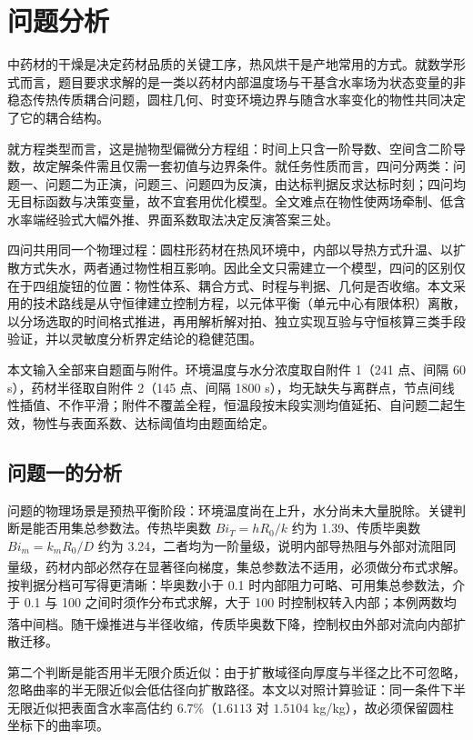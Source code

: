 \section{问题分析}
中药材的干燥是决定药材品质的关键工序，热风烘干是产地常用的方式。就数学形式而言，题目要求求解的是一类以药材内部温度场与干基含水率场为状态变量的非稳态传热传质耦合问题，圆柱几何、时变环境边界与随含水率变化的物性共同决定了它的耦合结构。

就方程类型而言，这是抛物型偏微分方程组：时间上只含一阶导数、空间含二阶导数，故定解条件需且仅需一套初值与边界条件。就任务性质而言，四问分两类：问题一、问题二为正演，问题三、问题四为反演，由达标判据反求达标时刻；四问均无目标函数与决策变量，故不宜套用优化模型。全文难点在物性使两场牵制、低含水率端经验式大幅外推、界面系数取法决定反演答案三处。

四问共用同一个物理过程：圆柱形药材在热风环境中，内部以导热方式升温、以扩散方式失水，两者通过物性相互影响。因此全文只需建立一个模型，四问的区别仅在于四组旋钮的位置：物性体系、耦合方式、时程与判据、几何是否收缩。本文采用的技术路线是从守恒律建立控制方程，以元体平衡（单元中心有限体积）离散，以分场选取的时间格式推进，再用解析解对拍、独立实现互验与守恒核算三类手段验证，并以灵敏度分析界定结论的稳健范围。

本文输入全部来自题面与附件。环境温度与水分浓度取自附件 1（241 点、间隔 60 s），药材半径取自附件 2（145 点、间隔 1800 s），均无缺失与离群点，节点间线性插值、不作平滑；附件不覆盖全程，恒温段按末段实测均值延拓、自问题二起生效，物性与表面系数、达标阈值均由题面给定。

\subsection{问题一的分析}
问题的物理场景是预热平衡阶段：环境温度尚在上升，水分尚未大量脱除。关键判断是能否用集总参数法。传热毕奥数 $Bi_T=hR_0/k$ 约为 1.39、传质毕奥数 $Bi_m=k_mR_0/D$ 约为 3.24，二者均为一阶量级，说明内部导热阻与外部对流阻同量级，药材内部必然存在显著径向梯度，集总参数法不适用，必须做分布式求解\textsuperscript{\cite{ref1,ref8}}。按判据分档可写得更清晰：毕奥数小于 0.1 时内部阻力可略、可用集总参数法，介于 0.1 与 100 之间时须作分布式求解，大于 100 时控制权转入内部；本例两数均落中间档\textsuperscript{\cite{ref1,ref8}}。随干燥推进与半径收缩，传质毕奥数下降，控制权由外部对流向内部扩散迁移。

第二个判断是能否用半无限介质近似：由于扩散域径向厚度与半径之比不可忽略，忽略曲率的半无限近似会低估径向扩散路径。本文以对照计算验证：同一条件下半无限近似把表面含水率高估约 6.7\%（$1.6113$ 对 $1.5104$ kg/kg），故必须保留圆柱坐标下的曲率项。

